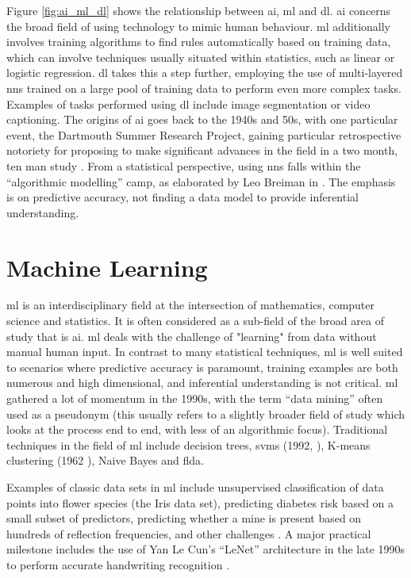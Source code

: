 Figure \ref{fig:ai_ml_dl} shows the relationship between \gls{ai}, \gls{ml} and \gls{dl}. \gls{ai} concerns the broad field of using technology to mimic human behaviour. \gls{ml} additionally involves training algorithms to find rules automatically based on training data, which can involve techniques usually situated within statistics, such as linear or logistic regression. \gls{dl} takes this a step further, employing the use of multi-layered \gls{nn}s trained on a large pool of training data to perform even more complex tasks. Examples of tasks performed using \gls{dl} include image segmentation or video captioning. The origins of \gls{ai} goes back to the 1940s and 50s, with one particular event, the Dartmouth Summer Research Project, gaining particular retrospective notoriety for proposing to make significant advances in the field in a two month, ten man study \cite{dartmouth_summer}. From a statistical perspective, using \gls{nn}s falls within the \enquote{algorithmic modelling} camp, as elaborated by Leo Breiman in \cite{two_cultures}. The emphasis is on predictive accuracy, not finding a data model to provide inferential understanding.

\section{Machine Learning}


\gls{ml} is an interdisciplinary field at the intersection of mathematics, computer science and statistics. It is often considered as a sub-field of the broad area of study that is \gls{ai}. \gls{ml} deals with the challenge of "learning" from data without manual human input. In contrast to many statistical techniques, \gls{ml} is well suited to scenarios where predictive accuracy is paramount, training examples are both numerous and high dimensional, and inferential understanding is not critical. \gls{ml} gathered a lot of momentum in the 1990s, with the term \enquote{data mining} often used as a pseudonym (this usually refers to a slightly broader field of study which looks at the process end to end, with less of an algorithmic focus). Traditional techniques in the field of \gls{ml} include decision trees,  \gls{svm}s (1992, \cite{svm}), K-means clustering (1962 \cite{k_means}), Naive Bayes and \gls{flda}.  
\bigskip

Examples of classic data sets in \gls{ml} include unsupervised classification of data points into flower species (the Iris data set), predicting diabetes risk based on a small subset of predictors, predicting whether a mine is present based on hundreds of reflection frequencies, and other challenges \cite{uci_ml_data}. A major practical milestone includes the use of Yan Le Cun's \enquote{LeNet} architecture in the late 1990s to perform accurate handwriting recognition \cite{LeNet}. 
\bigskip


